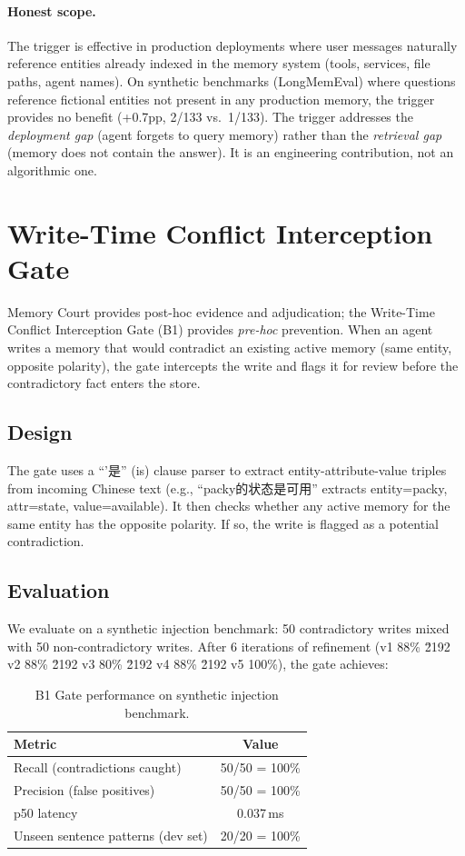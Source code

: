 \documentclass{article}
\begin{document}
\paragraph{Honest scope.}
The trigger is effective in production deployments where user messages naturally reference entities already indexed in the memory system (tools, services, file paths, agent names). On synthetic benchmarks (LongMemEval) where questions reference fictional entities not present in any production memory, the trigger provides no benefit (+0.7pp, 2/133 vs.\ 1/133). The trigger addresses the \emph{deployment gap} (agent forgets to query memory) rather than the \emph{retrieval gap} (memory does not contain the answer). It is an engineering contribution, not an algorithmic one.
\section{Write-Time Conflict Interception Gate}
\label{sec:b1gate}

Memory Court provides post-hoc evidence and adjudication; the Write-Time Conflict Interception Gate (B1) provides \emph{pre-hoc} prevention. When an agent writes a memory that would contradict an existing active memory (same entity, opposite polarity), the gate intercepts the write and flags it for review before the contradictory fact enters the store.

\subsection{Design}

The gate uses a ``'是'' (is) clause parser to extract entity-attribute-value triples from incoming Chinese text (e.g., ``packy的状态是可用'' extracts entity=packy, attr=state, value=available). It then checks whether any active memory for the same entity has the opposite polarity. If so, the write is flagged as a potential contradiction.

\subsection{Evaluation}

We evaluate on a synthetic injection benchmark: 50 contradictory writes mixed with 50 non-contradictory writes. After 6 iterations of refinement (v1 88\% \u2192 v2 88\% \u2192 v3 80\% \u2192 v4 88\% \u2192 v5 100\%), the gate achieves:

\begin{table}[h]
\centering
\caption{B1 Gate performance on synthetic injection benchmark.}
\begin{tabular}{lc}
\toprule
Metric & Value \\
\midrule
Recall (contradictions caught) & 50/50 = 100\% \\
Precision (false positives) & 50/50 = 100\% \\
p50 latency & 0.037\,ms \\
Unseen sentence patterns (dev set) & 20/20 = 100\% \\
\bottomrule
\end{tabular}
\end{table}
\end{document}
